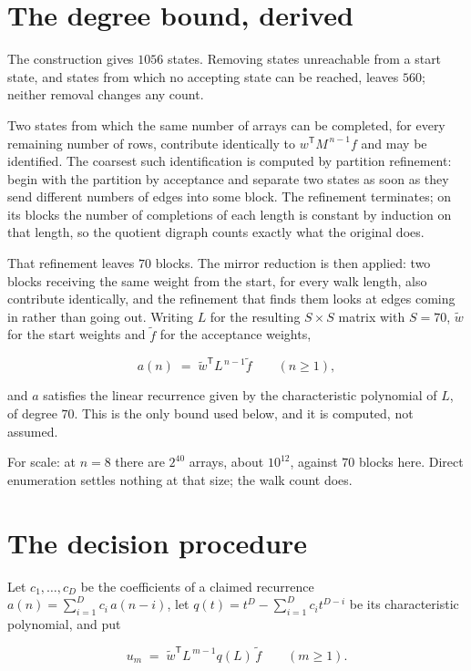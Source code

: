 \documentclass[11pt]{article}
\theoremstyle{definition}
\begin{document}
\section{The degree bound, derived}

The construction gives $1056$ states. Removing states unreachable from a start state, and states from which no accepting state can be reached, leaves $560$; neither removal changes any count.

Two states from which the same number of arrays can be completed, for every remaining number of rows, contribute identically to $w^{\mathsf T}M^{\,n-1}f$ and may be identified. The coarsest such identification is computed by partition refinement: begin with the partition by acceptance and separate two states as soon as they send different numbers of edges into some block. The refinement terminates; on its blocks the number of completions of each length is constant by induction on that length, so the quotient digraph counts exactly what the original does.

That refinement leaves $70$ blocks. The mirror reduction is then applied: two blocks receiving the same weight from the start, for every walk length, also contribute identically, and the refinement that finds them looks at edges coming in rather than going out. Writing $L$ for the resulting $S \times S$ matrix with $S = 70$, $\tilde w$ for the start weights and $\tilde f$ for the acceptance weights,

\[a(n) \;=\; \tilde w^{\mathsf T} L^{\,n-1} \tilde f \qquad (n \ge 1),\]

and $a$ satisfies the linear recurrence given by the characteristic polynomial of $L$, of degree $70$. This is the only bound used below, and it is computed, not assumed.

For scale: at $n = 8$ there are $2^{40}$ arrays, about $10^{12}$, against $70$ blocks here. Direct enumeration settles nothing at that size; the walk count does.

\section{The decision procedure}

Let $c_1,\dots,c_D$ be the coefficients of a claimed recurrence $a(n) = \sum_{i=1}^{D} c_i\,a(n-i)$, let $q(t) = t^{D} - \sum_{i=1}^{D} c_i t^{D-i}$ be its characteristic polynomial, and put

\[u_m \;=\; \tilde w^{\mathsf T} L^{\,m-1} q(L)\,\tilde f \qquad (m \ge 1).\]
\end{document}
